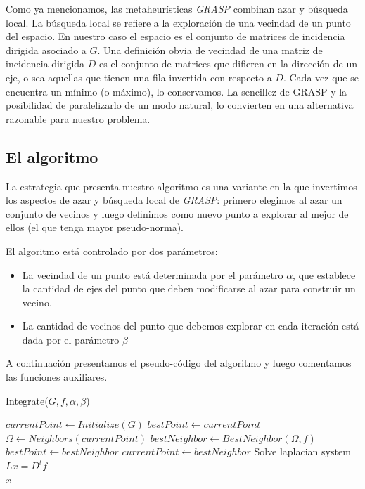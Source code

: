 \documentclass[10pt, a4paper, twocolumn]{article} %
\begin{document}
\smallskip

Como ya mencionamos, las metaheurísticas \textit{GRASP} combinan azar y 
búsqueda local. La búsqueda local se refiere a la exploración de 
una vecindad de un punto del espacio. En nuestro caso el espacio es el 
conjunto de matrices de incidencia dirigida asociado a $G$. Una 
definición obvia de vecindad de una matriz de incidencia dirigida $D$ es 
el conjunto de matrices que difieren en la dirección de un eje, o sea 
aquellas que tienen una fila invertida con respecto a $D$. Cada vez que 
se encuentra un mínimo (o máximo), lo conservamos. La sencillez de 
GRASP y la posibilidad de paralelizarlo de un modo natural, lo 
convierten en una alternativa razonable para nuestro problema.

\subsection{El algoritmo}

La estrategia que presenta nuestro algoritmo es una variante en la que 
invertimos los aspectos de azar y búsqueda local de \textit{GRASP}: 
primero elegimos al azar un conjunto de vecinos y luego definimos como 
nuevo punto a explorar al mejor de ellos (el que tenga mayor 
pseudo-norma). 

\smallskip

El algoritmo está controlado por dos parámetros:

\begin{itemize}
	\item La vecindad de un punto está determinada por el parámetro 
	$\alpha$, que establece la cantidad de ejes del punto que deben 
	modificarse al azar para construir un vecino.
	\item La cantidad de vecinos del punto que debemos explorar en cada 
	iteración está dada por el parámetro $\beta$
\end{itemize}

A continuación presentamos el pseudo-código del algoritmo y luego 
comentamos las funciones auxiliares.

\begin{algorithm}
    \caption{Integrate($G,f,\alpha,\beta$)}
	\begin{algorithmic}
		\State $currentPoint \gets Initialize(G)$
		\State $bestPoint \gets currentPoint$
			\State $\Omega \gets Neighbors(currentPoint)$
			\State $bestNeighbor \gets BestNeighbor(\Omega,f)$
				\State $bestPoint \gets bestNeighbor$
			\EndIf
			\State $currentPoint \gets bestNeighbor$
		\EndWhile
		\State Solve laplacian system $L x = D^t f$ \\
		\Return $x$
	\end{algorithmic}
	\label{alg:alg1}
\end{algorithm}
\end{document}
